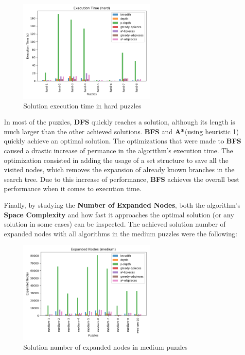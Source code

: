 \documentclass[conference]{IEEEtran}
\begin{document}
\begin{figure}[H]
    \centerline{\includegraphics[width=260px]{../../graphics/executionTime-hard.png}}
    \caption{Solution execution time in hard puzzles}
\end{figure}

In most of the puzzles, \textbf{DFS} quickly reaches a solution, although its length is much larger than the other achieved solutions. \textbf{BFS} and \textbf{A*}(using heuristic 1) quickly achieve an optimal solution. The optimizations that were made to \textbf{BFS} caused a drastic increase of permance in the algorithm's execution time. The optimization consisted in adding the usage of a set structure to save all the visited nodes, which removes the expansion of already known branches in the search tree. Due to this increase of performance, \textbf{BFS} achieves the overall best performance when it comes to execution time.

Finally, by studying the \textbf{Number of Expanded Nodes}, both the algorithm's \textbf{Space Complexity} and how fast it approaches the optimal solution (or any solution in some cases) can be inspected. The achieved solution number of expanded nodes with all algorithms in the medium puzzles were the following:

\begin{figure}[H]
    \centerline{\includegraphics[width=260px]{../../graphics/expandedNodes-medium.png}}
    \caption{Solution number of expanded nodes in medium puzzles}
\end{figure}
\end{document}
